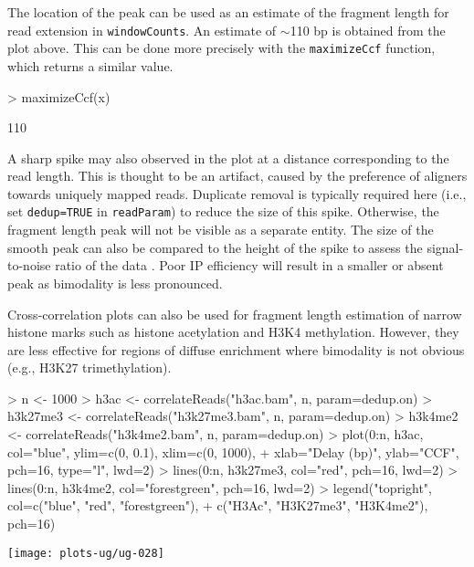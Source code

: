 \documentclass[12pt]{report}
\renewenvironment{Schunk}{\vspace{0pt}}{\vspace{0pt}}
\newcommand{\code}[1]{{\small\texttt{#1}}}
\begin{document}
The location of the peak can be used as an estimate of the fragment length for read extension in \code{windowCounts}. 
An estimate of $\sim$110 bp is obtained from the plot above.
This can be done more precisely with the \code{maximizeCcf} function, which returns a similar value.

\begin{Schunk}
\begin{Sinput}
> maximizeCcf(x)
\end{Sinput}
\begin{Soutput}
[1] 110
\end{Soutput}
\end{Schunk}

A sharp spike may also observed in the plot at a distance corresponding to the read length. 
This is thought to be an artifact, caused by the preference of aligners towards uniquely mapped reads. 
Duplicate removal is typically required here (i.e., set \code{dedup=TRUE} in \code{readParam}) to reduce the size of this spike. 
Otherwise, the fragment length peak will not be visible as a separate entity.
The size of the smooth peak can also be compared to the height of the spike to assess the signal-to-noise ratio of the data \citep{landt2012}. 
Poor IP efficiency will result in a smaller or absent peak as bimodality is less pronounced. 

Cross-correlation plots can also be used for fragment length estimation of narrow histone marks such as histone acetylation and H3K4 methylation.
However, they are less effective for regions of diffuse enrichment where bimodality is not obvious (e.g., H3K27 trimethylation).

\begin{Schunk}
\begin{Sinput}
> n <- 1000
> h3ac <- correlateReads("h3ac.bam", n, param=dedup.on)
> h3k27me3 <- correlateReads("h3k27me3.bam", n, param=dedup.on)
> h3k4me2 <- correlateReads("h3k4me2.bam", n, param=dedup.on)
> plot(0:n, h3ac, col="blue", ylim=c(0, 0.1), xlim=c(0, 1000),
+     xlab="Delay (bp)", ylab="CCF", pch=16, type="l", lwd=2)
> lines(0:n, h3k27me3, col="red", pch=16, lwd=2)
> lines(0:n, h3k4me2, col="forestgreen", pch=16, lwd=2)
> legend("topright", col=c("blue", "red", "forestgreen"),
+     c("H3Ac", "H3K27me3", "H3K4me2"), pch=16)
\end{Sinput}
\end{Schunk}
\label{data:ccf}

\begin{center}
\texttt{[image: plots-ug/ug-028]}
\end{center}
\end{document}
